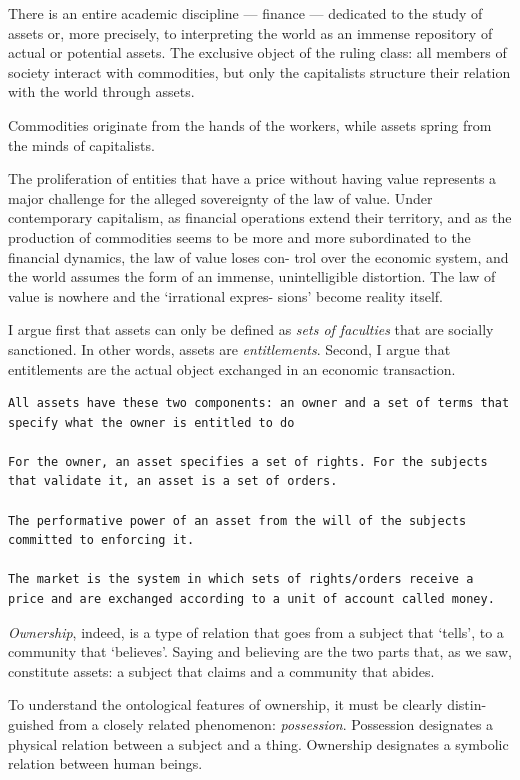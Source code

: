 \documentclass[
]{book}
\begin{document}
There is an entire academic discipline --- finance ---
dedicated to the study of assets or, more precisely, to interpreting the world as
an immense repository of actual or potential assets.
The exclusive
object of the ruling class: all members of society interact with commodities, but
only the capitalists structure their relation with the world through assets.

Commodities originate from the hands of the workers, while assets spring from
the minds of capitalists.

The proliferation of entities that have a price
without having value represents a major challenge for the alleged sovereignty
of the law of value. Under contemporary capitalism, as financial operations
extend their territory, and as the production of commodities seems to be more
and more subordinated to the financial dynamics, the law of value loses con-
trol over the economic system, and the world assumes the form of an immense,
unintelligible distortion. The law of value is nowhere and the `irrational expres-
sions' become reality itself.

I argue first that assets can only be defined as \emph{sets of faculties} that are socially
sanctioned. In other words, assets are \emph{entitlements}. Second, I argue that
entitlements are the actual object exchanged in an economic transaction.

\begin{verbatim}
All assets have these two components: an owner and a set of terms that specify what the owner is entitled to do

For the owner, an asset specifies a set of rights. For the subjects that validate it, an asset is a set of orders.

The performative power of an asset from the will of the subjects committed to enforcing it.

The market is the system in which sets of rights/orders receive a price and are exchanged according to a unit of account called money.
\end{verbatim}

\emph{Ownership}, indeed, is a type
of relation that goes from a subject that `tells', to a community that `believes'.
Saying and believing are the two parts that, as we saw, constitute assets: a
subject that claims and a community that abides.

To understand the ontological features of ownership, it must be clearly distin-
guished from a closely related phenomenon: \emph{possession}. Possession designates
a physical relation between a subject and a thing. Ownership designates a
symbolic relation between human beings.
\end{document}
